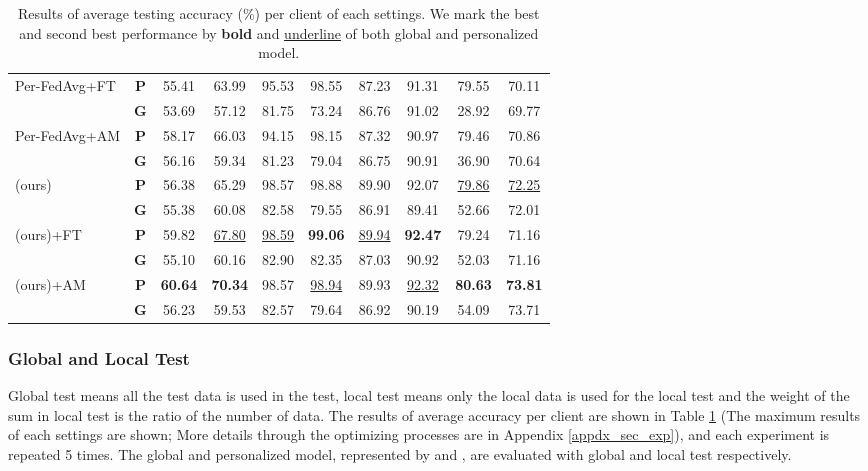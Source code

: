 \documentclass{article}
\begin{document}
\begin{table}[t]
{\begin{tabular}{l|c|cc|cc|cc|c|c}
        Per-FedAvg+FT  & \textbf{P} & 55.41 & 63.99 & 95.53 & 98.55 & 87.23 & 91.31 & 79.55 & 70.11\\
        & \textbf{G} & 53.69 & 57.12 & 81.75 & 73.24 & 86.76 & 91.02 & 28.92 & 69.77\\
        
        Per-FedAvg+AM  & \textbf{P} & 58.17 & 66.03 & 94.15 & 98.15 & 87.32 & 90.97 & 79.46 & 70.86\\
        & \textbf{G} & 56.16 & 59.34 & 81.23 & 79.04 & 86.75 & 90.91 & 36.90 & 70.64\\
           
        \hline
        
         (ours) & \textbf{P} & 56.38 & 65.29 & 98.57 & 98.88 & 89.90 & 92.07 & \underline{79.86} & \underline{72.25}\\
        & \textbf{G} & 55.38 & 60.08 & 82.58 & 79.55 & 86.91 & 89.41 & 52.66 & 72.01\\
        
         (ours)+FT & \textbf{P} & 59.82 & \underline{67.80} & \underline{98.59} & \textbf{99.06} & \underline{89.94} & \textbf{92.47} & 79.24 & 71.16\\
        & \textbf{G} & 55.10 & 60.16 & 82.90 & 82.35 & 87.03 & 90.92 & 52.03 & 71.16\\

         (ours)+AM & \textbf{P} & \textbf{60.64} & \textbf{70.34} & 98.57 & \underline{98.94} & 89.93 & \underline{92.32} & \textbf{80.63} & \textbf{73.81}\\
        & \textbf{G} & 56.23 & 59.53 & 82.57 & 79.64 & 86.92 & 90.19 & 54.09 & 73.71\\
     
        \hline
    \end{tabular}
    }
    \caption{Results of average testing accuracy (\%) per client of each settings. We mark the best and second best performance by \textbf{bold} and \underline{underline} of both global and personalized model.}
    \label{tbl_res_lnlm}
\end{table}

\subsubsection{Global and Local Test}
\label{sssec_glt}

Global test means all the test data is used in the test, local test means only the local data is used for the local test and the weight of the sum in local test is the ratio of the number of data. The results of average accuracy per client are shown in Table \ref{tbl_res_lnlm} (The maximum results of each settings are shown; More details through the optimizing processes are in Appendix \ref{appdx_sec_exp}), and each experiment is repeated 5 times. The global and personalized model, represented by  and , are evaluated with global and local test respectively. 
\end{document}
